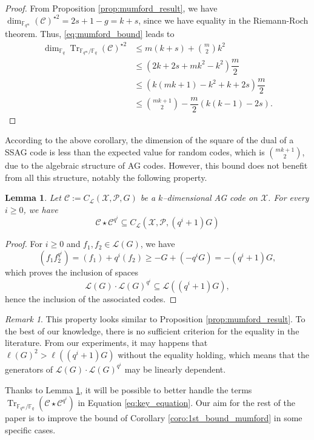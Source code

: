 \documentclass[a4paper]{amsart}
\newtheorem{lemma}[thm]{Lemma}
\theoremstyle{definition}
\theoremstyle{remark}
\newtheorem{remark}[thm]{Remark}
\newcommand{\calL}{\mathcal{L}}
\newcommand{\calC}{\mathcal{C}}
\newcommand{\calX}{\mathcal{X}}
\newcommand{\fqm}{\mathbb{F}_{q^m}}
\newcommand{\fq}{\mathbb{F}_{q}}
\newcommand{\Tr}[1]{\operatorname{Tr}_{\mathbb{F}_{q^m}/\fq}\left(#1\right)}
\begin{document}
\begin{proof}
 From Proposition \ref{prop:mumford_result}, we have $\dim_{\fqm}(\calC)^{\star2} = 2s+1-g = k+s$, since we have equality in the Riemann-Roch theorem. Thus, \eqref{eq:mumford_bound} leads to
 \begin{align*}
  \dim_{\fq}\Tr{\calC}^{\star2} &\leq m(k+s) + \binom{m}{2}k^2 \\
  &\leq (2k+2s+mk^2-k^2) \dfrac{m}{2} \\
  &\leq (k(mk+1)-k^2+k+2s) \dfrac{m}{2} \\
  &\leq \binom{mk+1}{2} - \dfrac{m}{2}(k(k-1)-2s) .
 \end{align*}
\end{proof}

According to the above corollary, the dimension of the square of the dual of a SSAG code is less than the expected value for random codes, which is $\binom{mk+1}{2}$, due to the algebraic structure of AG codes. However, this bound does not benefit from all this structure, notably the following property.

\begin{lemma}\label{lem:Schur-Product-Power}
	 Let $\mathcal{C} := C_{\calL}(\calX,\mathcal{P},G)$ be a $k$--dimensional AG code on $\calX$. For every $i \geq 0$, we have
	 \[\calC \star \calC^{q^i} \subseteq C_{\calL}(\calX,\mathcal{P},(q^i+1)G)\]
\end{lemma}

\begin{proof}
	For $i \geq 0$ and $f_1,f_2 \in \calL(G)$, we have 
	$$(f_1f_2^{q^i}) = (f_1)+q^i(f_2) \geq -G +(-q^iG) = -(q^i+1)G,$$
	which proves the inclusion of spaces
	$$ \calL(G)\cdot \calL(G)^{q^i} \subseteq \calL((q^i+1)G),$$
	hence the inclusion of the associated codes.
\end{proof}

\begin{remark}
This property looks similar to Proposition \ref{prop:mumford_result}. To the best of our knowledge, there is no sufficient criterion for the equality in the literature. From our experiments, it may happens that $\ell(G)^2 > \ell((q^i+1)G)$ without the equality holding, which means that the generators of $\calL(G)\cdot \calL(G)^{q^i}$ may be linearly dependent. 
\end{remark}

Thanks to Lemma \ref{lem:Schur-Product-Power}, it will be possible to better handle the terms $\Tr{\calC\star \calC^{q^i}}$ in Equation \eqref{eq:key_equation}. Our aim for the rest of the paper is to improve the bound of Corollary \ref {coro:1st_bound_mumford} in some specific cases.
\end{document}
